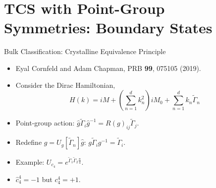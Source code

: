 \documentclass[xcolor=table, 11pt, aspectratio=169]{beamer}
\begin{document}
  \section{TCS with Point-Group Symmetries: Boundary States}

  \begin{frame}{Bulk Classification: Crystalline Equivalence Principle}
    \begin{itemize}
      \item<1-> Eyal Cornfeld and Adam Chapman, PRB \textbf{99}, 075105 (2019).
      \item<1-> Consider the Dirac Hamiltonian,
      \[H(k)=iM+\left(\sum_{n=1}^d k_n^2\right)iM_0+\sum_{n=1}^d k_n\tilde{\Gamma}_n\]
      \item<1-> Point-group action: $\hat g \tilde\Gamma_i\hat g^{-1}=R(g)_{ij}\tilde\Gamma_j.$
      \item<2-> Redefine $g=U_g[\tilde\Gamma_n]\hat g$: $g \tilde\Gamma_ig^{-1}=\tilde\Gamma_i.$
      \item<3-> Example: $U_{c_4}=e^{\tilde\Gamma_1\tilde\Gamma_2\frac\pi4}$.
      \item<4-> $\hat c_4^4=-1$ but $c_4^4=+1$. 

    \end{itemize}
  \end{frame}
\end{document}
